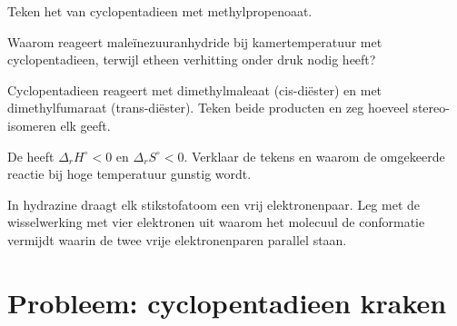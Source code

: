 \begin{exercise}[$\star\star$]\label{exo:b2:frontier-orbitals:8}
Teken het  van cyclopentadieen met methylpropenoaat.
\end{exercise}

\begin{exercise}[$\star\star$]\label{exo:b2:frontier-orbitals:9}
Waarom reageert maleïnezuuranhydride bij kamertemperatuur met cyclopentadieen, terwijl etheen
verhitting onder druk nodig heeft?
\end{exercise}

\begin{exercise}[$\star\star\star$]\label{exo:b2:frontier-orbitals:10}
Cyclopentadieen reageert met dimethylmaleaat (cis-diëster) en met dimethylfumaraat
(trans-diëster). Teken beide producten en zeg hoeveel stereo-isomeren elk geeft.
\end{exercise}

\begin{exercise}[$\star\star\star$]\label{exo:b2:frontier-orbitals:11}
De  heeft $\Delta_r H^\circ < 0$ en $\Delta_r S^\circ < 0$. Verklaar de tekens
en waarom de omgekeerde reactie bij hoge temperatuur gunstig wordt.
\end{exercise}

\begin{exercise}[$\star\star\star$]\label{exo:b2:frontier-orbitals:12}
In hydrazine  draagt elk stikstofatoom een vrij elektronenpaar. Leg met de wisselwerking met vier
elektronen uit waarom het molecuul de conformatie vermijdt waarin de twee vrije
elektronenparen parallel staan.
\end{exercise}

\section{Probleem: cyclopentadieen kraken}

